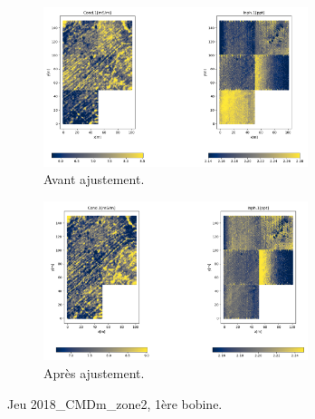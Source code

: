 \documentclass[12pt]{article}
\begin{document}
    \begin{figure}[ht!]
        \centering
        \begin{subfigure}[b]{\textwidth}
            \centering
            \includegraphics[width=0.85\textwidth]{Images/Frontiere_ex2_1.png}
            \caption[]%
            {{ \small Avant ajustement.}}    
        \end{subfigure}
        \centering
        \begin{subfigure}[b]{\textwidth}  
            \centering 
            \includegraphics[width=0.85\textwidth]{Images/Frontiere_ex2_1_aj.png}
            \caption[]%
            {{\small Après ajustement.}}    
        \end{subfigure}
        \caption{Jeu 2018\_CMDm\_zone2, 1ère bobine.}
    \end{figure}
\newpage
\end{document}
